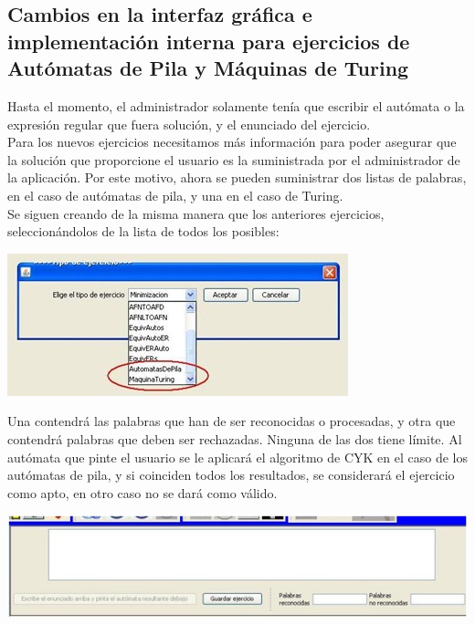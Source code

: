 \documentclass[12pt,a4paper,spanish]{book}
\begin{document}
\subsection{Cambios en la interfaz gr\'afica e implementaci\'on interna para ejercicios de Aut\'omatas de Pila y M\'aquinas de Turing}
Hasta el momento, el administrador solamente ten\'ia que escribir el aut\'omata o la expresi\'on regular que fuera soluci\'on, y el enunciado del ejercicio.\\
\newline
Para los nuevos ejercicios necesitamos m\'as informaci\'on para poder asegurar que la soluci\'on que proporcione el usuario es la suministrada por el administrador de la aplicaci\'on. Por este motivo, ahora se pueden suministrar dos listas de palabras, en el caso de aut\'omatas de pila, y una en el caso de Turing.\\
\newline
Se siguen creando de la misma manera que los anteriores ejercicios,\\ seleccion\'andolos de la lista de todos los posibles:\\
\begin{center}
\includegraphics{ejer1.jpg}
\end{center}
\newpage
Una contendr\'a las palabras que han de ser reconocidas o procesadas, y otra que contendr\'a palabras que deben ser rechazadas. Ninguna de las dos tiene l\'imite.  Al aut\'omata que pinte el usuario se le aplicar\'a el algoritmo de CYK en el caso de los aut\'omatas de pila, y si coinciden todos los resultados, se considerar\'a el ejercicio como apto, en otro caso no se dar\'a como v\'alido.\\
\begin{center}
\includegraphics{ejer2.jpg}
\end{center}
\end{document}
